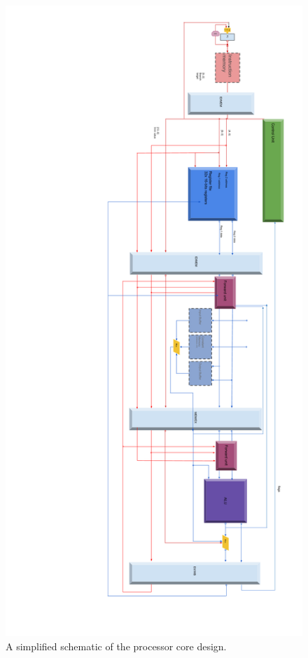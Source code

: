 \begin{figure}
	\centering
	\includegraphics[width=0.8\linewidth]{figures/fpga/core_schematic}
	\caption{A simplified schematic of the processor core design.}
	\label{fig:core_schematic}
\end{figure}